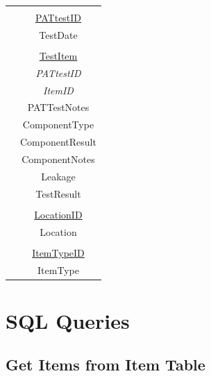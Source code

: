 \begin{center}
\begin{tabular}{|c|c|}
                                   &				                \\
                                   & \underline{PATtestID}         \\
                                   & TestDate                      \\   
                                   &				                \\
                                   & \underline{TestItem}          \\
                                   & \emph{PATtestID}              \\
                                   & \emph{ItemID}	                \\
                                   & PATTestNotes                  \\
                                   & ComponentType                 \\
                                   & ComponentResult               \\
                                   & ComponentNotes                \\
                                   & Leakage                       \\ 
                                   & TestResult                    \\ 
                                   &                               \\
                                   & \underline{LocationID}        \\
                                   & Location                      \\
                                   &                               \\
                                   & \underline{ItemTypeID}        \\
                                   & ItemType                      \\ \hline                                
    \end{tabular}
\end{center}

\section{SQL Queries}

\subsection{Get Items from Item Table}


